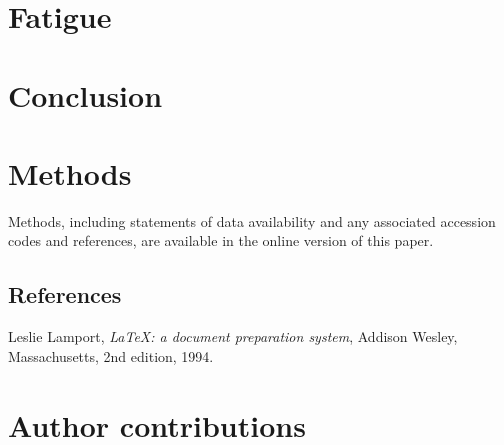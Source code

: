 \documentclass[twocolumn, linenumbers, superscriptaddress]{revtex4-1}
\begin{document}
	\section*{Fatigue}
		\lipsum

	\section*{Conclusion}
		\blindtext[3]

	\section*{Methods}
		Methods, including statements of data availability and any associated accession codes and references, are available in the online version of this paper.
	
	\begin{thebibliography}{50}
		\section*{References}	
			Leslie Lamport,
			\textit{\LaTeX: a document preparation system},
			Addison Wesley, Massachusetts,
			2nd edition,
			1994.

	\end{thebibliography}

	\begin{acknowledgements}
		\blindtext
	\end{acknowledgements}

	\section*{Author contributions}
		\blindtext
	
\end{document}
